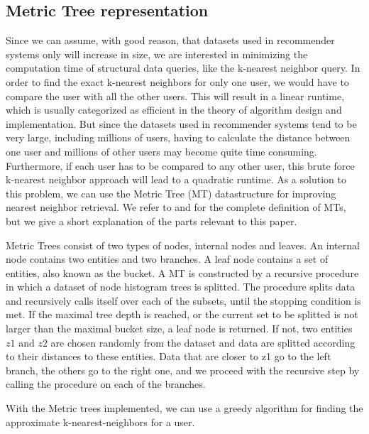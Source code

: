 \subsection{Metric Tree representation}
  Since we can assume, with good reason, that datasets used in recommender systems only will increase in size, we are interested in minimizing the computation time of structural data queries, like the k-nearest neighbor query. In order to find the exact k-nearest neighbors for only one user, we would have to compare the user with all the other users. This will result in a linear runtime, which is usually categorized as efficient in the theory of algorithm design and implementation. But since the datasets used in recommender systems tend to be very large, including millions of users, having to calculate the distance between one user and millions of other users may become quite time consuming. Furthermore, if each user has to be compared to any other user, this brute force k-nearest neighbor approach will lead to a quadratic runtime. As a solution to this problem, we can use the Metric Tree (MT) datastructure for improving nearest neighbor retrieval. We refer to \cite{jaeger2019counts} and \cite{uhlmann1991} for the complete definition of MTs, but we give a short explanation of the parts relevant to this paper.
  
  Metric Trees consist of two types of nodes, internal nodes and leaves. An internal node contains two entities and two branches. A leaf node contains a set of entities, also known as the bucket. A MT is constructed by a recursive procedure in which a dataset of node histogram trees is splitted. The procedure splits data and recursively calls itself over each of the subsets, until the stopping condition is met. If the maximal tree depth is reached, or the current set to be splitted is not larger than the maximal bucket size, a leaf node is returned. If not, two entities $z1$ and $z2$ are chosen randomly from the dataset and data are splitted according to their distances to these entities. Data that are closer to z1 go to the left branch, the others go to the right one, and we proceed with the recursive step by calling the procedure on each of the branches.

With the Metric trees implemented, we can use a greedy algorithm for finding the approximate k-nearest-neighbors for a user.
